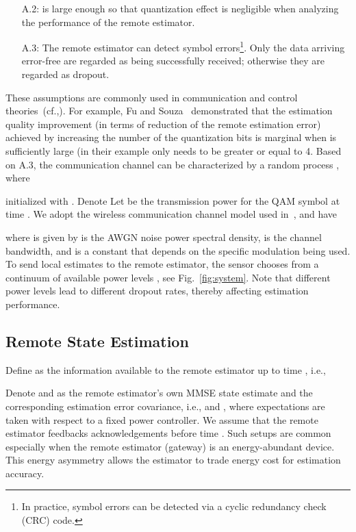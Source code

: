 \documentclass[twocolumn]{autart}    \usepackage{cite}
\begin{document}
{\begin{enumerate}
\item[A.2:]
 is large enough so that quantization effect is negligible when
analyzing the performance of the remote estimator.
\item[A.3:]\label{asmpt:assumption-SER-2-gamma}
The remote estimator can
detect symbol errors\footnote{In practice, symbol errors can be detected via a cyclic redundancy check (CRC) code.}. Only the
data arriving error-free are regarded as being successfully received; otherwise they are regarded as dropout.
\end{enumerate}
\vspace{-3.5mm}
These assumptions are commonly used in communication and control
{theories~(cf.,\cite{sinopoli2004kalman,fu2009Automatica,queahl10,leong2012power,GatsisACC13}).}
{For example, Fu and Souza~\cite{fu2009Automatica} demonstrated that the estimation quality improvement (in terms of reduction of the remote estimation error) achieved by
increasing the number  of the quantization bits is marginal when  is sufficiently large (in their example  only needs to be greater or equal to 4.} Based on A.3, the communication channel can be characterized by a random process , where\vspace{-1mm}

initialized with .
{Denote }
Let  be the transmission power for the QAM symbol
at time .
We adopt the wireless communication channel model used in~\cite{Liyuzhe13CDC}, and have

where  is given by 
 is the AWGN noise power spectral
density,  is the channel bandwidth, and  is a
constant that depends on the specific modulation being used.
To send local estimates to the remote estimator, the sensor chooses from a continuum of available power levels , see
Fig.~\ref{fig:system}. Note that different power levels lead to different
dropout rates, thereby affecting estimation performance.


\subsection{Remote State Estimation} \label{sec:remote-state-estim}
Define  as the information available to the remote estimator up to time , i.e.,

 Denote  and  as the remote estimator's own MMSE state estimate and the corresponding estimation error covariance, i.e.,
   and
  ,
{where expectations are taken with respect to a fixed
power controller.}
We
assume that the remote estimator feedbacks acknowledgements  before time . Such setups are common especially when the remote
estimator (gateway) is an energy-abundant device.
This energy asymmetry allows the estimator to trade energy cost for estimation
accuracy.



}
\end{document}
